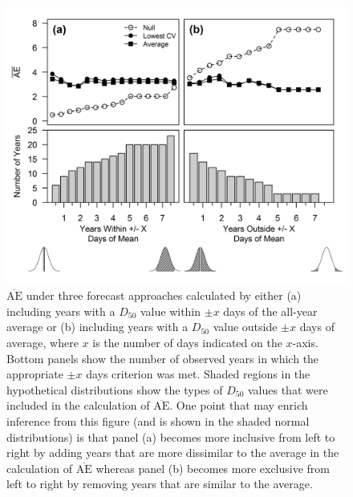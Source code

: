 \documentclass[12pt,]{book}
\theoremstyle{definition}
\theoremstyle{definition}
\theoremstyle{definition}
\theoremstyle{remark}
\begin{document}
\begin{figure}
  \centering
  \includegraphics{img/Ch2/mae-subsets.png}
  \caption{$\overline{\text{AE}}$ under three forecast approaches calculated by either (a) including years with a $D_{50}$ value within $\pm x$  days of the all-year average or (b) including years with a $D_{50}$ value outside $\pm x$ days of average, where $x$ is the number of days indicated on the $x$-axis. Bottom panels show the number of observed years in which the appropriate $\pm x$ days criterion was met. Shaded regions in the hypothetical distributions show the types of $D_{50}$ values that were included in the calculation of $\overline{\text{AE}}$. One point that may enrich inference from this figure (and is shown in the shaded normal distributions) is that panel (a) becomes more inclusive from left to right by adding years that are more dissimilar to the average in the calculation of $\overline{\text{AE}}$ whereas panel (b) becomes more exclusive from left to right by removing years that are similar to the average.}
  \label{fig:mae-subsets}
\end{figure}

\clearpage
\end{document}
